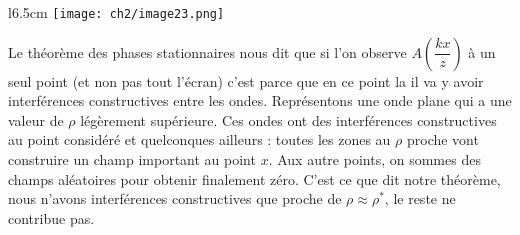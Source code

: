 \begin{wrapfigure}[10]{l}{6.5cm}
	\vspace{-3mm}
	\texttt{[image: ch2/image23.png]}
	\end{wrapfigure}	
Le théorème des phases stationnaires nous dit que si l'on observe $A\left(\dfrac{kx}{z}
\right)$ à un seul point (et non pas tout l'écran) c'est parce que en ce point la il va 
y avoir interférences constructives entre les ondes. Représentons une onde plane qui a une 
valeur de $\rho$ légèrement supérieure. Ces ondes ont des interférences constructives au 
point considéré et quelconques ailleurs : toutes les zones au $\rho$ proche vont 
construire un champ important au point $x$. Aux autre points, on sommes des champs aléatoires 
pour obtenir finalement zéro. C'est ce que dit notre théorème, nous n'avons interférences 
constructives que proche de $\rho \approx \rho^*$, le reste ne contribue pas.
	






































